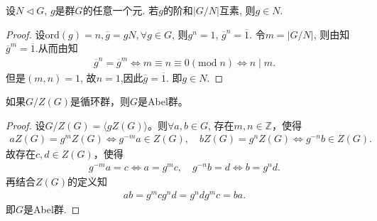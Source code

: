 \documentclass[../../main.tex]{subfiles}%
\begin{document}
\begin{example}
设$N \lhd G$, $g$是群$G$的任意一个元. 若$g$的阶和$|G/N|$互素, 则$g \in N$.
\end{example}
\begin{proof}

设$\text{ord}(g) = n,\overline{g}=gN,\forall g\in G$, 则$g^n = 1$, $\overline{g}^n = \overline{1}$. 令$m = |G/N|$, 则由知$\overline{g}^m = \overline{1}$.从而由知
\begin{align*}
\overline{g}^n=\overline{g}^m\Longleftrightarrow m\equiv n\equiv 0\left( \mathrm{mod}\;n \right) \Longleftrightarrow n\mid m.
\end{align*}
但是$(m,n)=1$, 故$n=1$,因此$\overline{g} = \overline{1}$. 即$g \in N$.

\end{proof}

\begin{proposition}\label{proposition:群商中心循环则必为Abel群}
如果$G/Z(G)$是循环群，则$G$是Abel群。
\end{proposition}
\begin{proof}

设$G/Z(G) = \langle gZ(G)\rangle$。则$\forall a, b \in G$, 存在$m,n\in \mathbb{Z}$，使得
\begin{align*}
aZ(G)=g^mZ(G)\Longleftrightarrow g^{-m}a\in Z(G),\quad bZ(G)=g^nZ(G)\Longleftrightarrow g^{-n}b\in Z(G).
\end{align*}
故存在$c,d\in Z(G)$，使得
\begin{align*}
g^{-m}a=c\Longleftrightarrow a=g^mc,\quad g^{-n}b=d\Longleftrightarrow b=g^nd.
\end{align*}
再结合$Z(G)$的定义知
\begin{align*}
ab=g^mcg^nd=g^ndg^mc=ba.
\end{align*}
即$G$是Abel群.

\end{proof}
\end{document}
